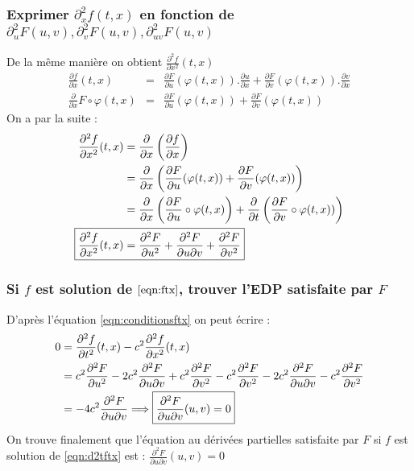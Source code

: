 \documentclass[12pt]{article}
\begin{document}
\subsubsection{Exprimer $\partial^{2}_{x} f(t,x)$ en fonction de $ \partial^{2}_{u} F(u,v),\partial^{2}_{v} F(u,v),\partial^{2}_{uv} F(u,v)$}
De la même manière on obtient $\frac{\partial^2 f}{\partial x^2}(t,x)$
\[
\begin{matrix}
\frac{\partial f}{\partial x}(t,x) & = & \frac{\partial F}{\partial u}(\varphi(t,x)).\frac{\partial u}{\partial x} + \frac{\partial F}{\partial v}(\varphi(t,x)).\frac{\partial v}{\partial x} \\[0.4cm]
\frac{\partial}{\partial x}F\circ \varphi(t,x) & = & \frac{\partial F}{\partial u}(\varphi(t,x)) +\frac{\partial F}{\partial v}(\varphi(t,x))
\end{matrix}
\]
On a par la suite :
\begin{align}
\frac{\partial^2 f}{\partial x^2}(t,x) &=\frac{\partial}{\partial x}\left(\frac{\partial f}{\partial x}\right) \notag \\
&=\frac{\partial}{\partial x}\left( \frac{\partial F}{\partial u}(\varphi(t,x)) + \frac{\partial F}{\partial v}(\varphi(t,x))\right) \notag \\ 
&=\frac{\partial}{\partial x}\left( \frac{\partial F}{\partial u}\circ\varphi(t,x)\right) + \frac{\partial}{\partial t}\left( \frac{\partial F}{\partial v}\circ\varphi(t,x))\right) \notag \\
\Aboxed{\frac{\partial^2 f}{\partial x^2}(t,x) &=\frac{\partial^2 F}{\partial u^2}+\frac{\partial^2 F}{\partial u \partial v}+\frac{\partial^2 F}{\partial v^2}}
\end{align}
\subsubsection{Si $f$ est solution de $\eqref{eqn:ftx}$, trouver l'EDP satisfaite par $F$}
D'après l'équation \eqref{eqn:conditionsftx} on peut écrire :
\begin{align}
0	&=\frac{\partial^2 f}{\partial t^2}(t,x)-c^2\frac{\partial^2 f}{\partial x^2}(t,x) \notag \\
	&=c^2\frac{\partial^2 F}{\partial u^2}-2c^2\frac{\partial^2 F}{\partial u \partial v}+c^2\frac{\partial^2 F}{\partial v^2}-c^2\frac{\partial^2 F}{\partial v^2}-2c^2\frac{\partial^2 F}{\partial u \partial v}-c^2\frac{\partial^2 F}{\partial v^2} \notag \\
	&=-4c^2\frac{\partial^2 F}{\partial u \partial v} \Longrightarrow \boxed{\frac{\partial^2 F}{\partial u \partial v}(u,v)=0} 
\end{align}
On trouve finalement que l'équation au dérivées partielles satisfaite par $F$ si $f$ est solution de \eqref{eqn:d2tftx} est : $\frac{\partial^2 F}{\partial u \partial v}(u,v)=0$
\end{document}
